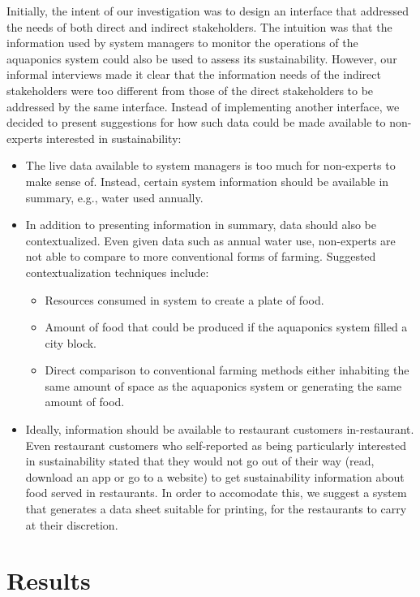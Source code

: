 \documentclass{sigchi}
\begin{document}
Initially, the intent of our investigation was to design an interface that addressed the needs of both direct and indirect stakeholders. The intuition was that the information used by system managers to monitor the operations of the aquaponics system could also be used to assess its sustainability. However, our informal interviews made it clear that the information needs of the indirect stakeholders were too different from those of the direct stakeholders to be addressed by the same interface. Instead of implementing another interface, we decided to present suggestions for how such data could be made available to non-experts interested in sustainability:
\begin{itemize}
\item The live data available to system managers is too much for non-experts to make sense of. Instead, certain system information should be available in summary, e.g., water used annually.
\item In addition to presenting information in summary, data should also be contextualized. Even given data such as annual water use, non-experts are not able to compare to more conventional forms of farming. Suggested contextualization techniques include:
	\begin{itemize}
	\item Resources consumed in system to create a plate of food.
	\item Amount of food that could be produced if the aquaponics system filled a city block. 
	\item Direct comparison to conventional farming methods either inhabiting the same amount of space as the aquaponics system or generating the same amount of food.
	\end{itemize}
\item Ideally, information should be available to restaurant customers in-restaurant. Even restaurant customers who self-reported as being particularly interested in sustainability stated that they would not go out of their way (read, download an app or go to a website) to get sustainability information about food served in restaurants. In order to accomodate this, we suggest a system that generates a data sheet suitable for printing, for the restaurants to carry at their discretion. 
\end{itemize}

\section{Results}
\end{document}
